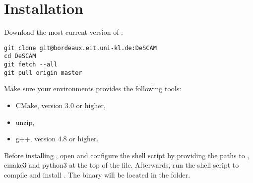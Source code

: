 
\section{Installation}
\label{sec:installation}

Download the most current version of \DeSCAM{}:

\begin{verbatim}
git clone git@bordeaux.eit.uni-kl.de:DeSCAM
cd DeSCAM
git fetch --all
git pull origin master
\end{verbatim}

Make sure your environments provides the following tools: 
\begin{itemize}
 \item CMake, version 3.0 or higher,
 \item unzip, 
 \item g++, version 4.8 or higher. 
\end{itemize}

Before installing \DeSCAM{}, open and configure the shell script
 by providing the paths to \DeSCAM{}, cmake3
and python3 at the top of the file. %
Afterwards, run the shell script to compile and install \DeSCAM{}. %
The binary will be located in the  folder.

